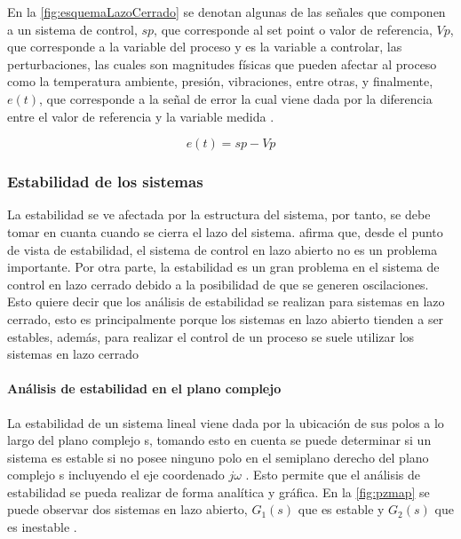            En la \cref{fig:esquemaLazoCerrado} se denotan algunas de las señales que componen a un sistema de control, $sp$, que corresponde al set point o valor de referencia, $Vp$, que corresponde a la variable del proceso y es la variable a controlar, las perturbaciones, las cuales son magnitudes físicas que pueden afectar al proceso como la temperatura ambiente, presión, vibraciones, entre otras, y finalmente, $e(t)$, que corresponde a la señal de error la cual viene dada por la diferencia entre el valor de referencia y la variable medida \Parencite{maloney2006electronica}.
            
            \begin{equation}\label{eq:Serror}
				e(t) = sp - Vp
            \end{equation}
            
        \subsubsection{Estabilidad de los sistemas}

            La estabilidad se ve afectada por la estructura del sistema, por tanto, se debe tomar en cuanta cuando se cierra el lazo del sistema. \textcite{ogata2003ingenieria} afirma que, desde el punto de vista de estabilidad, el sistema de control en lazo abierto no es un problema importante. Por otra parte, la estabilidad es un gran problema en el sistema de control en lazo cerrado debido a la posibilidad de que se generen oscilaciones. Esto quiere decir que los análisis de estabilidad se realizan para sistemas en lazo cerrado, esto es principalmente porque los sistemas en lazo abierto tienden a ser estables, además, para realizar el control de un proceso se suele utilizar los sistemas en lazo cerrado

            \paragraph{Análisis de estabilidad en el plano complejo}
            
                La estabilidad de un sistema lineal viene dada por la ubicación de sus polos a lo largo del plano complejo s, tomando esto en cuenta se puede determinar si un sistema es estable si no posee ninguno polo en el semiplano derecho del plano complejo s incluyendo el eje coordenado $j\omega$ \Parencite{ogata2003ingenieria}. Esto permite que el análisis de estabilidad se pueda realizar de forma analítica y gráfica. En la \cref{fig:pzmap} se puede observar dos sistemas en lazo abierto, $G_1(s)$ que es estable y $G_2(s)$ que es inestable .

